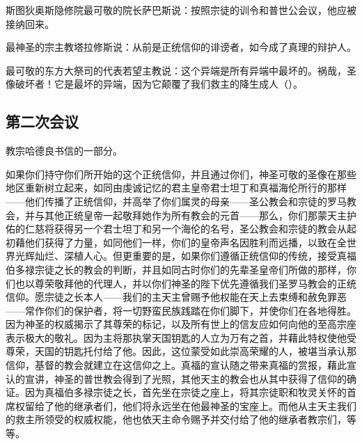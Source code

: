 斯图狄奥斯隐修院最可敬的院长萨巴斯说：按照宗徒的训令和普世公会议，他应被接纳回来。\par

最神圣的宗主教塔拉修斯说：从前是正统信仰的诽谤者，如今成了真理的辩护人。\par

\par

最可敬的东方大祭司的代表若望主教说：这个异端是所有异端中最坏的。祸哉，圣像破坏者！它是最坏的异端，因为它颠覆了我们救主的降生成人（）。\par


\subsection{第二次会议}

\par

教宗哈德良书信的一部分。\par

\par

\par

如果你们持守你们所开始的这个正统信仰，并且通过你们，神圣可敬的圣像在那些地区重新树立起来，如同由虔诚记忆的君主皇帝君士坦丁和真福海伦所行的那样——他们传播了正统信仰，并高举了你们属灵的母亲——圣公教会和宗徒的罗马教会，并与其他正统皇帝一起敬拜她作为所有教会的元首——那么，你们那蒙天主护佑的仁慈将获得另一个君士坦丁和另一个海伦的名号，圣公教会和宗徒的教会从起初藉他们获得了力量，如同他们一样，你们的皇帝声名因胜利而远播，以致在全世界光辉灿烂、深植人心。但更重要的是，如果你们遵循正统信仰的传统，接受真福伯多禄宗徒之长的教会的判断，并且如同古时你们的先辈圣皇帝们所做的那样，你们也以尊荣敬拜他的代理人，并以你们神圣的陛下优先遵循我们圣罗马教会的正统信仰。愿宗徒之长本人——我们的主天主曾赐予他权能在天上去束缚和赦免罪恶——常作你们的保护者，将一切野蛮民族践踏在你们脚下，并使你们在各地得胜。因为神圣的权威揭示了其尊荣的标记，以及所有世上的信友应如何向他的至高宗座表示极大的敬礼。因为主将那执掌天国钥匙的人立为万有之首，并藉此特权使他受尊荣，天国的钥匙托付给了他。因此，这位蒙受如此崇高荣耀的人，被堪当承认那信仰，基督的教会就建立在这信仰之上。真福的宣认随之带来真福的赏报，藉此宣认的宣讲，神圣的普世教会得到了光照，其他天主的教会也从其中获得了信仰的确证。因为真福伯多禄宗徒之长，首先坐在宗徒之座上，将其宗徒职和牧灵关怀的首席权留给了他的继承者们，他们将永远坐在他最神圣的宝座上。而他从主天主我们的救主所领受的权威权能，他也依天主命令赐予并交付给了他的继承者教宗们，等等。\par

